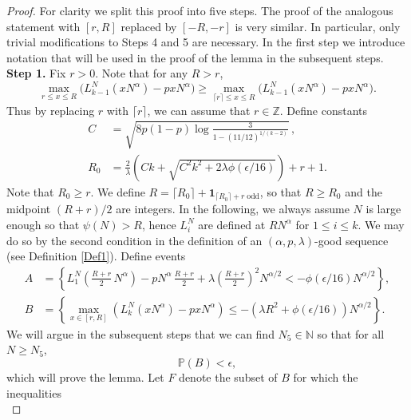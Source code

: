 	\begin{proof}
		
		For clarity we split this proof into five steps. The proof of the analogous statement with $[r,R]$ replaced by $[-R,-r]$ is very similar. In particular, only trivial modifications to Steps 4 and 5 are necessary. In the first step we introduce notation that will be used in the proof of the lemma in the subsequent steps.\\
		
		\noindent\textbf{Step 1.} Fix $r>0$. Note that for any $R>r$,
		\[
		\max_{r\leq x\leq R} \big(L_{k-1}^N(xN^\alpha) - pxN^\alpha\big) \geq \max_{\lceil r\rceil \leq x \leq R} \big(L_{k-1}^N(xN^\alpha) - pxN^\alpha\big).
		\]
		Thus by replacing $r$ with $\lceil r\rceil$, we can assume that $r\in\mathbb{Z}$. Define constants
		\begin{align}
		C &= \sqrt{ 8p(1-p) \log\frac{3}{1-(11/12)^{1/(k-2)}}}\,,\label{21Cdef}\\
		R_0 &= \frac{2}{\lambda}\left(Ck+\sqrt{C^{2}k^{2}+2\lambda\phi(\epsilon/16)}\right) + r + 1. \label{21Rdef}
		\end{align}
		Note that $R_0\geq r$. We define $R = \lceil R_0\rceil + \mathbf{1}_{\lceil R_0\rceil + r\;\mathrm{odd}}$, so that $R\geq R_0$ and the midpoint $(R+r)/2$ are integers. In the following, we always assume $N$ is large enough so that $\psi(N) > R$, hence $L_i^N$ are defined at $RN^\alpha$ for $1\leq i\leq k$. We may do so by the second condition in the definition of an $(\alpha,p,\lambda)$-good sequence (see Definition \ref{Def1}). Define events
		\begin{equation}\label{21AB}
		\begin{split}
		A &= \left\{L_1^N\left(\frac{R+r}{2}\,N^\alpha\right) - pN^\alpha\,\frac{R+r}{2} + \lambda\left(\frac{R+r}{2}\right)^2 N^{\alpha/2} < -\phi(\epsilon/16)N^{\alpha/2}\right\},\\
		B &= \left\{\max_{x\in[r,R]} \left(L_k^N(xN^\alpha) - pxN^\alpha\right) \leq -(\lambda R^2 + \phi(\epsilon/16)) N^{\alpha/2} \right\}.
		\end{split}
		\end{equation}
		We will argue in the subsequent steps that we can find $N_5\in\mathbb{N}$ so that for all $N\geq N_5$,
		\begin{equation}\label{21Bbound}
		\mathbb{P}(B) < \epsilon,
		\end{equation}
		which will prove the lemma. Let $F$ denote the subset of $B$ for which the inequalities
		\begin{equation}\label{21x1y1}

\end{equation}
\end{proof}

